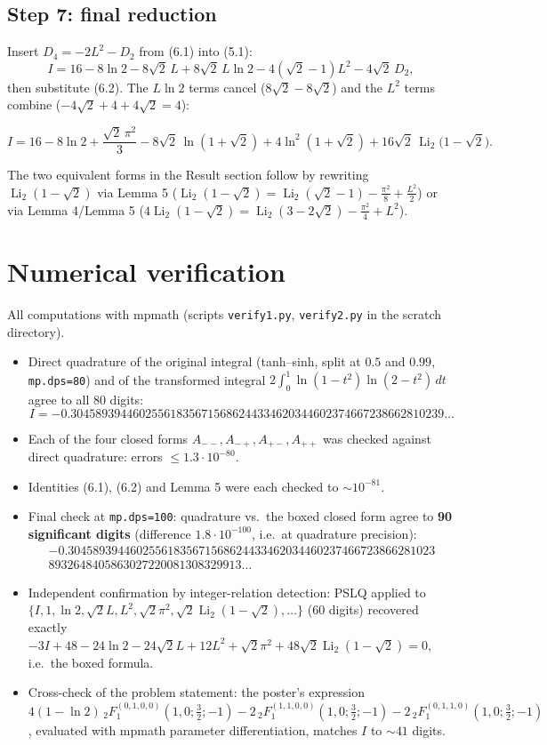 \documentclass[11pt]{article}
\theoremstyle{remark}
\begin{document}
\subsection*{Step 7: final reduction}

Insert $D_4=-2L^2-D_2$ from (6.1) into (5.1):
$$I=16-8\ln2-8\sqrt2\,L+8\sqrt2\,L\ln2-4(\sqrt2-1)L^{2}-4\sqrt2\,D_2 ,$$
then substitute (6.2). The $L\ln 2$ terms cancel ($8\sqrt2-8\sqrt2$) and the $L^2$ terms combine ($-4\sqrt2+4+4\sqrt2=4$):

$$I=16-8\ln 2+\frac{\sqrt2\,\pi^{2}}{3}-8\sqrt2\,\ln(1+\sqrt2)+4\ln^{2}(1+\sqrt2)+16\sqrt2\,\operatorname{Li}_2\!\big(1-\sqrt2\big).$$

The two equivalent forms in the Result section follow by rewriting $\operatorname{Li}_2(1-\sqrt2)$ via Lemma 5 ($\operatorname{Li}_2(1-\sqrt2)=\operatorname{Li}_2(\sqrt2-1)-\tfrac{\pi^2}{8}+\tfrac{L^2}{2}$) or via Lemma 4/Lemma 5 ($4\operatorname{Li}_2(1-\sqrt2)=\operatorname{Li}_2(3-2\sqrt2)-\tfrac{\pi^2}{4}+L^2$).

\section*{Numerical verification}

All computations with mpmath (scripts \texttt{verify1.py}, \texttt{verify2.py} in the scratch directory).

\begin{itemize}
\item Direct quadrature of the original integral (tanh--sinh, split at $0.5$ and $0.99$, \texttt{mp.dps=80}) and of the transformed integral $2\int_0^1\ln(1-t^2)\ln(2-t^2)\,dt$ agree to all $80$ digits:
  $$I=-0.304589394460255618356715686244334620344602374667238662810239\ldots$$
\item Each of the four closed forms $A_{--},A_{-+},A_{+-},A_{++}$ was checked against direct quadrature: errors $\le 1.3\cdot10^{-80}$.
\item Identities (6.1), (6.2) and Lemma 5 were each checked to $\sim10^{-81}$.
\item Final check at \texttt{mp.dps=100}: quadrature vs.\ the boxed closed form agree to \textbf{90 significant digits} (difference $1.8\cdot10^{-100}$, i.e.\ at quadrature precision):
  \[\begin{gathered}\scriptstyle -0.30458939446025561835671568624433462034460237466723866281023\\[-2pt]\scriptstyle 8932648405863027220081308329913\ldots\end{gathered}\]
\item Independent confirmation by integer-relation detection: PSLQ applied to $\{I,1,\ln2,\sqrt2L,L^2,\sqrt2\pi^2,\sqrt2\operatorname{Li}_2(1-\sqrt2),\dots\}$ (60 digits) recovered exactly
  $-3I+48-24\ln2-24\sqrt2L+12L^2+\sqrt2\pi^2+48\sqrt2\operatorname{Li}_2(1-\sqrt2)=0$, i.e.\ the boxed formula.
\item Cross-check of the problem statement: the poster's expression $4(1-\ln 2)\,{}_2F_1^{(0,1,0,0)}(1,0;\tfrac32;-1)-2\,{}_2F_1^{(1,1,0,0)}(1,0;\tfrac32;-1)-2\,{}_2F_1^{(0,1,1,0)}(1,0;\tfrac32;-1)$, evaluated with mpmath parameter differentiation, matches $I$ to $\sim41$ digits.
\end{itemize}
\end{document}
